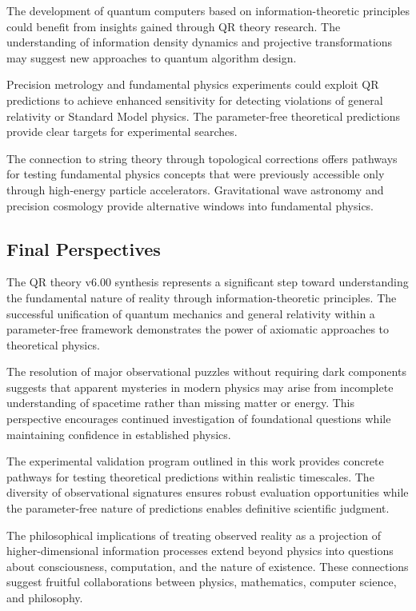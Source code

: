 The development of quantum computers based on information-theoretic principles could benefit from insights gained through QR theory research. The understanding of information density dynamics and projective transformations may suggest new approaches to quantum algorithm design.

Precision metrology and fundamental physics experiments could exploit QR predictions to achieve enhanced sensitivity for detecting violations of general relativity or Standard Model physics. The parameter-free theoretical predictions provide clear targets for experimental searches.

The connection to string theory through topological corrections offers pathways for testing fundamental physics concepts that were previously accessible only through high-energy particle accelerators. Gravitational wave astronomy and precision cosmology provide alternative windows into fundamental physics.

\subsection{Final Perspectives}
\label{subsec:final-perspectives}

The QR theory v6.00 synthesis represents a significant step toward understanding the fundamental nature of reality through information-theoretic principles. The successful unification of quantum mechanics and general relativity within a parameter-free framework demonstrates the power of axiomatic approaches to theoretical physics.

The resolution of major observational puzzles without requiring dark components suggests that apparent mysteries in modern physics may arise from incomplete understanding of spacetime rather than missing matter or energy. This perspective encourages continued investigation of foundational questions while maintaining confidence in established physics.

The experimental validation program outlined in this work provides concrete pathways for testing theoretical predictions within realistic timescales. The diversity of observational signatures ensures robust evaluation opportunities while the parameter-free nature of predictions enables definitive scientific judgment.

The philosophical implications of treating observed reality as a projection of higher-dimensional information processes extend beyond physics into questions about consciousness, computation, and the nature of existence. These connections suggest fruitful collaborations between physics, mathematics, computer science, and philosophy.

